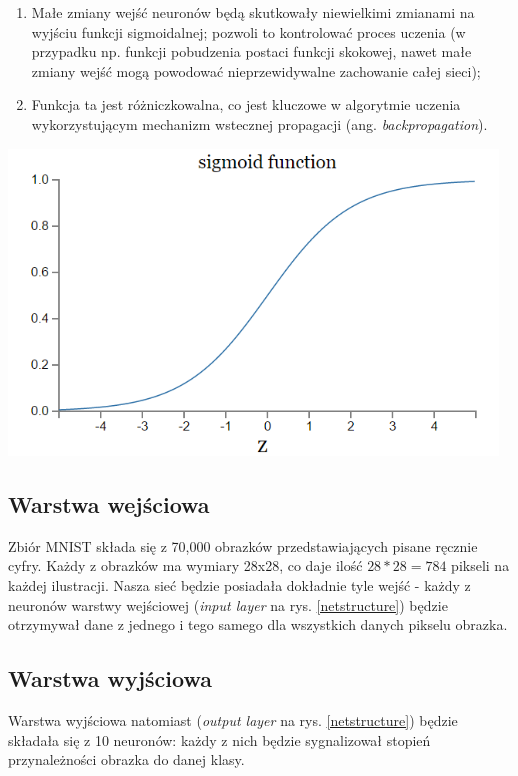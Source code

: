 \begin{enumerate}
	
	\item Małe zmiany wejść neuronów będą skutkowały niewielkimi zmianami na wyjściu funkcji sigmoidalnej; pozwoli to kontrolować proces uczenia (w przypadku np. funkcji pobudzenia postaci funkcji skokowej, nawet małe zmiany wejść mogą powodować nieprzewidywalne zachowanie całej sieci);
	\item Funkcja ta jest różniczkowalna, co jest kluczowe w algorytmie uczenia wykorzystującym mechanizm wstecznej propagacji (ang. \textit{backpropagation}).
	
\end{enumerate}
\vspace{1cm}
\begin{center}
	\includegraphics[width=13cm]{utils/sigm.png}
	\label{sigm}
\end{center}


\subsection{Warstwa wejściowa}
Zbiór MNIST składa się z 70,000 obrazków przedstawiających pisane ręcznie cyfry. Każdy z obrazków ma wymiary 28x28, co daje  ilość  $28*28 = 784$ pikseli na każdej ilustracji. Nasza sieć będzie posiadała dokładnie tyle wejść - każdy z neuronów warstwy wejściowej (\textit{input layer} na rys. \ref{netstructure}) będzie otrzymywał dane z jednego i tego samego dla wszystkich danych pikselu obrazka.

\subsection{Warstwa wyjściowa}
Warstwa wyjściowa natomiast (\textit{output layer} na rys. \ref{netstructure}) będzie składała się z 10 neuronów: każdy z nich będzie sygnalizował stopień przynależności obrazka do danej klasy.

